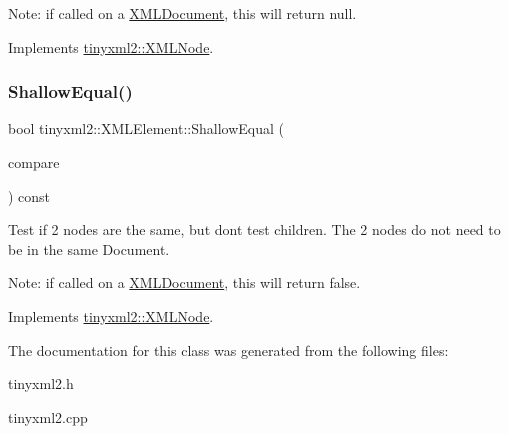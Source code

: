 Note\+: if called on a \mbox{\hyperlink{classtinyxml2_1_1_x_m_l_document}{X\+M\+L\+Document}}, this will return null. 

Implements \mbox{\hyperlink{classtinyxml2_1_1_x_m_l_node_a8402cbd3129d20e9e6024bbcc0531283}{tinyxml2\+::\+X\+M\+L\+Node}}.

\mbox{\label{classtinyxml2_1_1_x_m_l_element_a61ffd7bf918a9db4aa6203d855ac5ec2}} 
\subsubsection{\texorpdfstring{Shallow\+Equal()}{ShallowEqual()}}
{\footnotesize\ttfamily bool tinyxml2\+::\+X\+M\+L\+Element\+::\+Shallow\+Equal (\begin{DoxyParamCaption}\item[{const \mbox{\hyperlink{classtinyxml2_1_1_x_m_l_node}{X\+M\+L\+Node}} $\ast$}]{compare }\end{DoxyParamCaption}) const\hspace{0.3cm}{\ttfamily [virtual]}}

Test if 2 nodes are the same, but don\textquotesingle{}t test children. The 2 nodes do not need to be in the same Document.

Note\+: if called on a \mbox{\hyperlink{classtinyxml2_1_1_x_m_l_document}{X\+M\+L\+Document}}, this will return false. 

Implements \mbox{\hyperlink{classtinyxml2_1_1_x_m_l_node_a7ce18b751c3ea09eac292dca264f9226}{tinyxml2\+::\+X\+M\+L\+Node}}.



The documentation for this class was generated from the following files\+:\begin{DoxyCompactItemize}
\item 
tinyxml2.\+h\item 
tinyxml2.\+cpp\end{DoxyCompactItemize}
